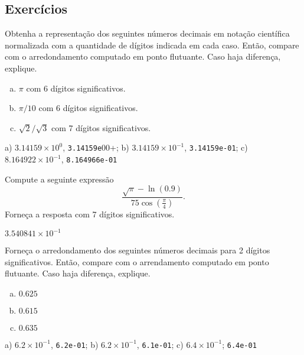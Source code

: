\subsection{Exercícios}

\begin{exer}
  Obtenha a representação dos seguintes números decimais em notação científica normalizada com a quantidade de dígitos indicada em cada caso. Então, compare com o arredondamento computado em ponto flutuante. Caso haja diferença, explique.
  \begin{enumerate}[a)]
  \item $\pi$ com 6 dígitos significativos.
  \item $\pi/10$ com 6 dígitos significativos.
  \item $\sqrt{2}/\sqrt{3}$ com 7 dígitos significativos.
  \end{enumerate}
\end{exer}
\begin{resp}
  a) $3.14159\times 10^0$, \lstinline+3.14159e+00+; b) $3.14159\times 10^{-1}$, \lstinline+3.14159e-01+; c) $8.164922\times 10^{-1}$, \lstinline+8.164966e-01+
\end{resp}

\begin{exer}
  Compute a seguinte expressão
  \begin{equation}
    \frac{\sqrt{\pi} - \ln(0.9)}{75\cos\left(\frac{\pi}{4}\right)}.
  \end{equation}
  Forneça a resposta com 7 dígitos significativos.
\end{exer}
\begin{resp}
  $3.540841\times 10^{-1}$
\end{resp}

\begin{exer}
  Forneça o arredondamento dos seguintes números decimais para 2 dígitos significativos. Então, compare com o arrendamento computado em ponto flutuante. Caso haja diferença, explique.
  \begin{enumerate}[a)]
  \item $0.625$
  \item $0.615$
  \item $0.635$
  \end{enumerate}
\end{exer}
\begin{resp}
  a) $6.2\times 10^{-1}$, \lstinline+6.2e-01+; b) $6.2\times 10^{-1}$, \lstinline+6.1e-01+; c) $6.4\times 10^{-1}$; \lstinline+6.4e-01+
\end{resp}

